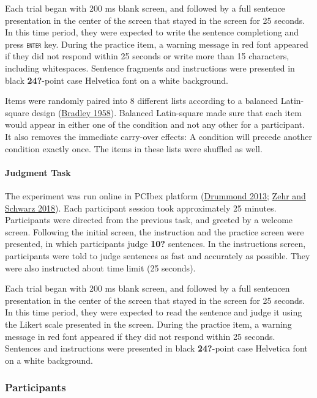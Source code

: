 \documentclass[
  10pt,
  letterpaper,
  DIV=11,
  numbers=noendperiod]{scrartcl}
\let\oldparagraph\paragraph
\renewcommand{\paragraph}[1]{\oldparagraph{#1}\mbox{}}
\begin{document}
Each trial began with 200 ms blank screen, and followed by a full
sentence presentation in the center of the screen that stayed in the
screen for 25 seconds. In this time period, they were expected to write
the sentence completiong and press \texttt{\textsc{enter}} key. During
the practice item, a warning message in red font appeared if they did
not respond within 25 seconds or write more than 15 characters,
including whitespaces. Sentence fragments and instructions were
presented in black \textbf{24?}-point case Helvetica font on a white
background.

Items were randomly paired into 8 different lists according to a
balanced Latin-square design
(\protect\hyperlink{ref-Bradley1958}{Bradley 1958}). Balanced
Latin-square made sure that each item would appear in either one of the
condition and not any other for a participant. It also removes the
immediate carry-over effects: A condition will precede another condition
exactly once. The items in these lists were shuffled as well.

\hypertarget{judgment-task-1}{%
\paragraph{Judgment Task}\label{judgment-task-1}}

The experiment was run online in PCIbex platform
(\protect\hyperlink{ref-Drummond2013}{Drummond 2013};
\protect\hyperlink{ref-ZehrSchwarz2018}{Zehr and Schwarz 2018}). Each
participant session took approximately 25 minutes. Participants were
directed from the previous task, and greeted by a welcome screen.
Following the initial screen, the instruction and the practice screen
were presented, in which participants judge \textbf{10?} sentences. In
the instructions screen, participants were told to judge sentences as
fast and accurately as possible. They were also instructed about time
limit (25 seconds).

Each trial began with 200 ms blank screen, and followed by a full
sentencen presentation in the center of the screen that stayed in the
screen for 25 seconds. In this time period, they were expected to read
the sentence and judge it using the Likert scale presented in the
screen. During the practice item, a warning message in red font appeared
if they did not respond within 25 seconds. Sentences and instructions
were presented in black \textbf{24?}-point case Helvetica font on a
white background.

\hypertarget{participants}{%
\subsubsection{Participants}\label{participants}}
\end{document}
